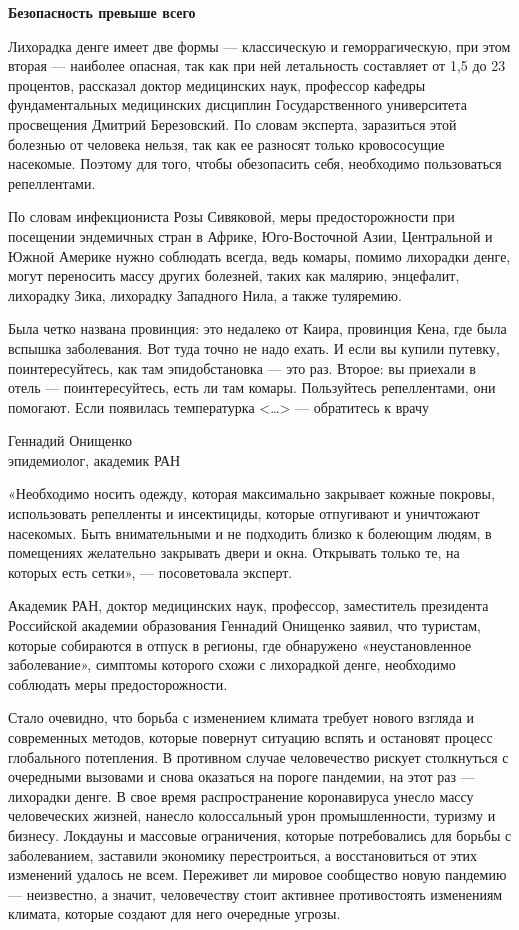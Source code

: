 \textbf{Безопасность превыше всего}

Лихорадка денге имеет две формы — классическую и геморрагическую, при этом вторая — наиболее опасная, так как при ней летальность составляет от 1,5 до 23 процентов, рассказал доктор медицинских наук, профессор кафедры фундаментальных медицинских дисциплин Государственного университета просвещения Дмитрий Березовский. По словам эксперта, заразиться этой болезнью от человека нельзя, так как ее разносят только кровососущие насекомые. Поэтому для того, чтобы обезопасить себя, необходимо пользоваться репеллентами.

По словам инфекциониста Розы Сивяковой, меры предосторожности при посещении эндемичных стран в Африке, Юго-Восточной Азии, Центральной и Южной Америке нужно соблюдать всегда, ведь комары, помимо лихорадки денге, могут переносить массу других болезней, таких как малярию, энцефалит, лихорадку Зика, лихорадку Западного Нила, а также туляремию.

\begin{fancyquotes}
    Была четко названа провинция: это недалеко от Каира, провинция Кена, где была вспышка заболевания. Вот туда точно не надо ехать. И если вы купили путевку, поинтересуйтесь, как там эпидобстановка — это раз. Второе: вы приехали в отель — поинтересуйтесь, есть ли там комары. Пользуйтесь репеллентами, они помогают. Если появилась температурка <…> — обратитесь к врачу

    \begin{flushright}
        Геннадий Онищенко\\
        эпидемиолог, академик РАН
    \end{flushright}
\end{fancyquotes}

«Необходимо носить одежду, которая максимально закрывает кожные покровы, использовать репелленты и инсектициды, которые отпугивают и уничтожают насекомых. Быть внимательными и не подходить близко к болеющим людям, в помещениях желательно закрывать двери и окна. Открывать только те, на которых есть сетки», — посоветовала эксперт.

Академик РАН, доктор медицинских наук, профессор, заместитель президента Российской академии образования Геннадий Онищенко заявил, что туристам, которые собираются в отпуск в регионы, где обнаружено «неустановленное заболевание», симптомы которого схожи с лихорадкой денге, необходимо соблюдать меры предосторожности.

Стало очевидно, что борьба с изменением климата требует нового взгляда и современных методов, которые повернут ситуацию вспять и остановят процесс глобального потепления. В противном случае человечество рискует столкнуться с очередными вызовами и снова оказаться на пороге пандемии, на этот раз — лихорадки денге. В свое время распространение коронавируса унесло массу человеческих жизней, нанесло колоссальный урон промышленности, туризму и бизнесу. Локдауны и массовые ограничения, которые потребовались для борьбы с заболеванием, заставили экономику перестроиться, а восстановиться от этих изменений удалось не всем. Переживет ли мировое сообщество новую пандемию — неизвестно, а значит, человечеству стоит активнее противостоять изменениям климата, которые создают для него очередные угрозы.
